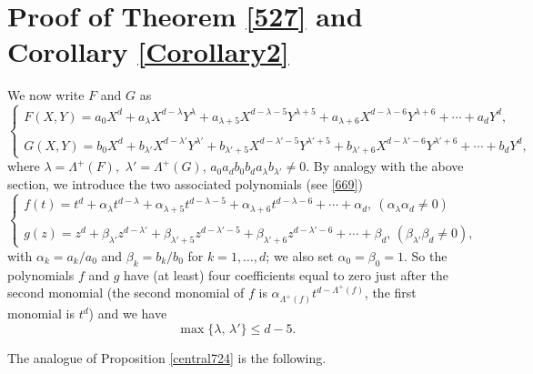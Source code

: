 \documentclass[10pt]{article}
\theoremstyle{definition}
\numberwithin{equation}{section}
\begin{document}
\section{Proof of Theorem \ref{527} and Corollary \ref{Corollary2}} \label{S:Proof527}
We now write $F$ and $G$ as 
\begin{equation*}
\begin{cases}
F(X,Y) = a_0X^{d} + a_{\lambda} X^{d-\lambda} Y^{\lambda} + a_{\lambda +5} X^{d-\lambda-5} Y^{\lambda +5}+a_{\lambda +6} X^{d-\lambda -6} Y ^{\lambda +6}+ \cdots + a_{d} Y^{d}, \\
\\
G(X,Y) = b_0X^{d} + b_{\lambda'} X^{d-\lambda'} Y^{\lambda'} + b_{\lambda' +5} X^{d-\lambda'-5} Y^{\lambda' +5}+b_{\lambda' +6} X^{d-\lambda' -6} Y ^{\lambda' +6}+ \cdots + b_{d} Y^{d}, 
\end{cases}
\end{equation*}
where $\lambda =\Lambda^+ (F), $ $\lambda' = \Lambda^+ (G)$, $ a_0a_db_0b_da_{\lambda}b_{\lambda'}\neq 0$.
By analogy with the above section, we introduce the two associated polynomials (see \eqref{669}) 
\begin{equation}\label{twopolynomials}
\begin{cases}
f(t) =t^{d}+\alpha_{\lambda}t^{d-\lambda} + \alpha_{\lambda +5} t^{d-\lambda -5} +\alpha_{\lambda +6} t^{d-\lambda -6} +\cdots +\alpha_{d},\ (\alpha_{\lambda}\alpha_d\neq 0)\\
\\
 g(z) =z^{d}+\beta_{\lambda'} z^{d-\lambda'} + \beta_{\lambda' +5} z^{d-\lambda' -5} +\beta_{\lambda'+6} z^{d-\lambda'-6} +\cdots +\beta_{d}, \, (\beta_{\lambda'} \beta_d \neq 0),
 \end{cases}
\end{equation}
with $\alpha_k =a_k/a_0$ and $\beta_k = b_k/b_0$ for $k=1,\dots, d$; we also set $\alpha_0=\beta_0=1$.
So the polynomials $f$ and $g$ have (at least) four coefficients equal to zero just after the second monomial 
(the second monomial of $f$ is $\alpha_{\Lambda^+ (f)} t^{d-\Lambda^+ (f)}$, the first monomial is $t^d$)
and we have
\begin{equation}\label{1144}
\max\{\lambda, \, \lambda'\} \leqslant d-5.
\end{equation}

 The analogue of Proposition \ref{central724} is the following.
 
\end{document}
